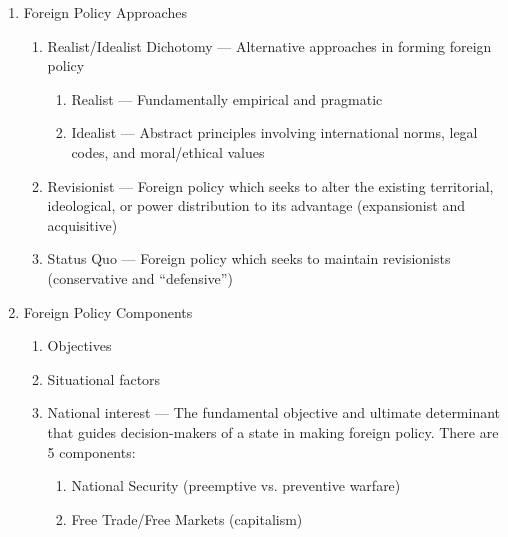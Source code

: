 \documentclass[12pt]{article}
\begin{document}
\begin{enumerate}
      \item Foreign Policy Approaches

        \begin{enumerate}

          \item Realist/Idealist Dichotomy — Alternative approaches in forming foreign policy

            \begin{enumerate}

              \item Realist — Fundamentally empirical and pragmatic

              \item Idealist — Abstract principles involving international norms, legal codes, and moral/ethical values

            \end{enumerate}

          \item Revisionist — Foreign policy which seeks to alter the existing territorial, ideological, or power distribution to its advantage (expansionist and acquisitive)

          \item Status Quo — Foreign policy which seeks to maintain revisionists (conservative and “defensive”)

        \end{enumerate}

      \item Foreign Policy Components

        \begin{enumerate}

          \item Objectives

          \item Situational factors

          \item National interest — The fundamental objective and ultimate determinant that guides decision-makers of a state in making foreign policy. There are 5 components: 

            \begin{enumerate}

              \item National Security (preemptive vs. preventive warfare)

              \item Free Trade/Free Markets (capitalism)


\end{enumerate}
\end{enumerate}
\end{enumerate}
\end{document}
